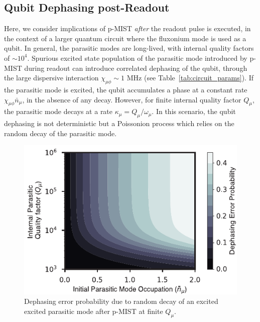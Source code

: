 \documentclass[%
reprint,
superscriptaddress,
 amsmath,amssymb,
 aps,
 prx,
longbibliography,
floatfix,
]{revtex4-2}
\begin{document}
\subsection{Qubit Dephasing post-Readout} 
Here, we consider implications of p-MIST \textit{after} the readout pulse is executed, in the context of a larger quantum circuit where the fluxonium mode is used as a qubit. In general, the parasitic modes are long-lived, with internal quality factors of $\sim 10^{4}$\cite{masluk_microwave_2012, masluk2013reducing}. Spurious excited state population of the parasitic mode introduced by p-MIST during readout can introduce correlated dephasing of the qubit, through the large dispersive interaction $\chi_{\mu \phi} \sim 1$ MHz (see Table~\ref{tab:circuit_params}). If the parasitic mode is excited, the qubit accumulates a phase at a constant rate $\chi_{\mu\phi} \bar n_\mu$, in the absence of any decay. However, for finite internal quality factor $Q_\mu$, the parasitic mode decays at a rate $\kappa_\mu=Q_\mu/\omega_\mu$. In this scenario, the qubit dephasing is not deterministic but a Poissonion process which relies on the random decay of the parasitic mode. 

\begin{figure}[htb]
    \centering
    \includegraphics[width=\linewidth]{Figures/dephasing.pdf}
    \caption{Dephasing error probability due to random decay of an excited excited parasitic mode after p-MIST at finite $Q_\mu$.}
    \label{fig:dephasing}
\end{figure}
\end{document}
